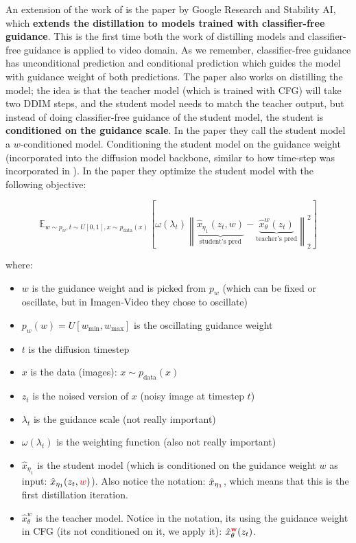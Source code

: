 An extension of the work of \cite{v_prediction} is the paper \cite{meng2023distillation} by Google Research and Stability AI, which \textbf{extends the distillation to models trained with classifier-free guidance}. This is the first time both the work of distilling models and classifier-free guidance is applied to video domain. As we remember, classifier-free guidance has unconditional prediction and conditional prediction which guides the model with guidance weight of both predictions. The paper also works on distilling the model; the idea is that the teacher model (which is trained with CFG) will take two DDIM steps, and the student model needs to match the teacher output, but instead of doing classifier-free guidance of the student model, the student is \textbf{conditioned on the guidance scale}. In the paper they call the student model a $w$-conditioned model. Conditioning the student model on the guidance weight (incorporated into the diffusion model backbone, similar to how time-step was incorporated in \cite{kingma2021variational}). In the paper \cite{meng2023distillation} they optimize the student model with the following objective:

\begin{equation*}
\mathbb{E}_{w \sim p_w, t \sim U[0, 1], x \sim p_{\text{data}}(x)} 
\left[ 
    \omega(\lambda_t) \left\| 
        \underbrace{\hat{x}_{\eta_1}(z_t, w)}_{\text{student's pred}} - 
        \underbrace{\hat{x}_{\theta}^w(z_t) }_{\text{teacher's pred}}
    \right\|_2^2 
\right]
\end{equation*}

where:

\begin{itemize}
    \item $w$ is the guidance weight and is picked from $p_w$ (which can be fixed or oscillate, but in Imagen-Video they chose to oscillate)
    \item $p_w(w) = U[w_{\text{min}}, w_{\text{max}}]$ is the oscillating guidance weight
    \item $t$ is the diffusion timestep
    \item $x$ is the data (images): $x \sim p_{\text{data}}(x)$
    \item $z_t$ is the noised version of $x$ (noisy image at timestep $t$)
    \item $\lambda_t$ is the guidance scale (not really important)
    \item $\omega(\lambda_t)$ is the weighting function (also not really important)
    \item $\hat{x}_{\eta_1}$ is the student model (which is conditioned on the guidance weight $w$ as input: $\hat{x}_{\eta_1}(z_t, \textcolor{red}{w})$). Also notice the notation: $\hat{x}_{\eta_\mathbf{\textcolor{red}{1}}}$, which means that this is the first distillation iteration.
    \item $\hat{x}_{\theta}^w$ is the teacher model. Notice in the notation, its using the guidance weight in CFG (its not conditioned on it, we apply it): $\hat{x}_{\theta}^\mathbf{\textcolor{red}{w}}(z_t)$.
\end{itemize}

